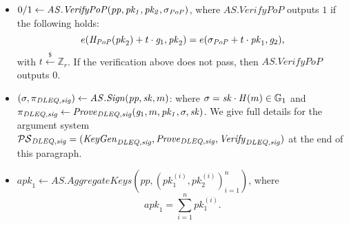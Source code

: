 \begin{construction}
\begin{itemize}

\item $0/1 \leftarrow \mathit{AS.VerifyPoP}(\mathit{pp}, \mathit{pk_1}, \mathit{pk_2}, \sigma_{\mathit{PoP}})$, 
where $\mathit{AS.VerifyPoP}$ outputs $1$ if the following holds:
$$e(\mathit{H}_{\mathit{PoP}}(\mathit{pk}_2) + t \cdot \mathit{g}_{1}, \mathit{pk}_2) = e(\sigma_{\mathit{PoP}} + t \cdot \mathit{pk}_1, \mathit{g}_{2}),$$
\noindent with $t \xleftarrow{\$} \mathbb{Z}_r$. If the verification above does not pass, 
then $\mathit{AS.VerifyPoP}$ outputs $0$.


\item $(\sigma, \pi_{\mathit{DLEQ}, \mathit{sig}}) \leftarrow \mathit{AS.Sign}(\mathit{pp}, \mathit{sk}, m)$: 
where $\sigma = \mathit{sk} \cdot \mathit{H}(m) \in \mathbb{G}_{1}$ and $ \pi_{\mathit{DLEQ}, \mathit{sig}} \leftarrow \mathit{Prove}_{\mathit{DLEQ}, \mathit{sig}}(\mathit{g}_{1}, m, \mathit{pk_1}, \sigma, \mathit{sk})$. We 
give full details for the argument system $\mathcal{PS}_{\mathit{DLEQ}, \mathit{sig}} = (\mathit{KeyGen}_{\mathit{DLEQ}, \mathit{sig}}, \mathit{Prove}_{\mathit{DLEQ}, \mathit{sig}}, \\ \mathit{Verify}_{\mathit{DLEQ}, \mathit{sig}})$ at the end of this paragraph.


\item $\mathit{apk}_1 \leftarrow \mathit{AS.AggregateKeys}(\mathit{pp}, (\mathit{pk_1^{(i)}}, \mathit{pk_2^{(i)}})_{i=1}^{n})$, 
where $$\mathit{apk}_1 = \sum_{i=1}^{n} \mathit{pk_1^{(i)}}.$$ 



\end{itemize}
\end{construction}
